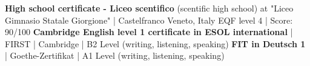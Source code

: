\begin{scholarship}
{	                }
					{\textbf{High school certificate - 
					Liceo scentifico} (scentific high school)
					}
	\scholarshipentry{}
	                {at "Liceo Gimnasio Statale Giorgione" |  Castelfranco Veneto, Italy}
	\scholarshipentry{}
	                {EQF level 4 | Score: 90/100}
	                {\textbf{Cambridge English level 1 certificate in ESOL international} | FIRST | Cambridge | B2 Level (writing, listening, speaking)
	                }
	                {\textbf{FIT in Deutsch 1} | Goethe-Zertifikat | A1 Level (writing, listening, speaking)
	                }
\end{scholarship}